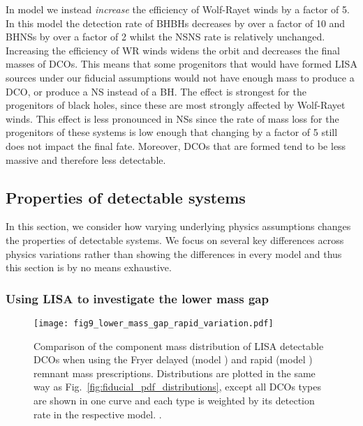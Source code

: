 In model \modWRHigh{} we instead \textit{increase} the efficiency of Wolf-Rayet winds by a factor of 5. In this model the detection rate of BHBHs decreases by over a factor of 10 and BHNSs by over a factor of 2 whilst the NSNS rate is relatively unchanged. Increasing the efficiency of WR winds widens the orbit and decreases the final masses of DCOs. This means that some progenitors that would have formed LISA sources under our fiducial assumptions would not have enough mass to produce a DCO, or produce a NS instead of a BH. The effect is strongest for the progenitors of black holes, since these are most strongly affected by Wolf-Rayet winds. This effect is less pronounced in NSs since the rate of mass loss for the progenitors of these systems is low enough that changing by a factor of 5 still does not impact the final fate. Moreover, DCOs that are formed tend to be less massive and therefore less detectable. 

\subsection{Properties of detectable systems}\label{sec:property_variations}

In this section, we consider how varying underlying physics assumptions changes the properties of detectable systems. We focus on several key differences across physics variations rather than showing the differences in every model and thus this section is by no means exhaustive.

\subsubsection{Using LISA to investigate the lower mass gap}\label{sec:lower_mass_gap}

\begin{figure}[tb]
    \centering
    \texttt{[image: fig9\_lower\_mass\_gap\_rapid\_variation.pdf]}
    \caption{Comparison of the component mass distribution of LISA detectable DCOs when using the Fryer delayed (model \modFid{}) and rapid (model \modRapid{}) remnant mass prescriptions. Distributions are plotted in the same way as Fig.~\ref{fig:fiducial_pdf_distributions}, except all DCOs types are shown in one curve and each type is weighted by its detection rate in the respective model. \href{https://github.com/TomWagg/detecting-DCOs-in-LISA/blob/main/paper/figures/fig9_lower_mass_gap_rapid_variation.pdf}{\faFileImage} \href{https://github.com/TomWagg/detecting-DCOs-in-LISA/blob/main/paper/figure_notebooks/variations.ipynb}{\faBook}.}
    \label{fig:lower_mass_gap_variation}
\end{figure}

